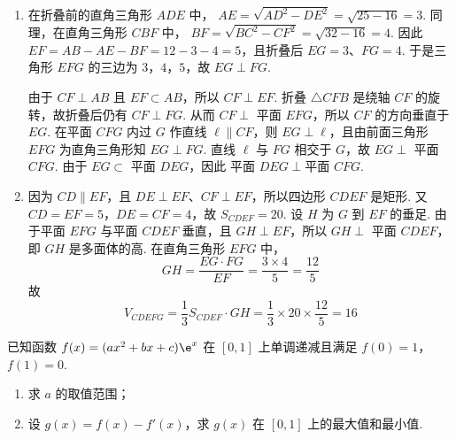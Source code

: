 \begin{solution}
\begin{enumerate}
\item 在折叠前的直角三角形 \(ADE\) 中，
\(AE=\sqrt{AD^2-DE^2}=\sqrt{25-16}=3\). 同理，在直角三角形 \(CBF\) 中，
\(BF=\sqrt{BC^2-CF^2}=\sqrt{32-16}=4\). 因此
\(EF=AB-AE-BF=12-3-4=5\)，且折叠后
\(EG=3\)、\(FG=4\). 于是三角形 \(EFG\) 的三边为 \(3\)，\(4\)，\(5\)，故
\(EG\perp FG\).

由于 \(CF\perp AB\) 且 \(EF\subset AB\)，所以 \(CF\perp EF\). 折叠 \(\triangle CFB\) 是绕轴 \(CF\) 的旋转，故折叠后仍有 \(CF\perp FG\). 从而
\(CF\perp\) 平面 \(EFG\)，所以 \(CF\) 的方向垂直于 \(EG\). 在平面 \(CFG\) 内过 \(G\) 作直线 \(\ell\parallel CF\)，则 \(EG\perp\ell\)，且由前面三角形 \(EFG\) 为直角三角形知 \(EG\perp FG\). 直线 \(\ell\) 与 \(FG\) 相交于 \(G\)，故
\(EG\perp\) 平面 \(CFG\). 由于 \(EG\subset\) 平面 \(DEG\)，因此
\(\text{平面 }DEG\perp\text{平面 }CFG\).

\item 因为 \(CD\parallel EF\)，且 \(DE\perp EF\)、\(CF\perp EF\)，所以四边形 \(CDEF\) 是矩形. 又 \(CD=EF=5\)，\(DE=CF=4\)，故
\(S_{CDEF}=20\). 设 \(H\) 为 \(G\) 到 \(EF\) 的垂足. 由于平面 \(EFG\) 与平面 \(CDEF\) 垂直，且 \(GH\perp EF\)，所以 \(GH\perp\) 平面 \(CDEF\)，即 \(GH\) 是多面体的高. 在直角三角形 \(EFG\) 中，
\[
GH=\frac{EG\cdot FG}{EF}=\frac{3\times4}{5}=\frac{12}{5}
\]
故
\[
V_{CDEFG}=\frac13S_{CDEF}\cdot GH
 =\frac13\times20\times\frac{12}{5}=16
\]
\end{enumerate}
\end{solution}

\begin{problem}
已知函数 \( f(x) = (ax^2 + bx + c)\e^x \) 在 \([0,1]\) 上单调递减且满足 \( f(0) = 1 \)，\( f(1) = 0 \).
\begin{enumerate}
\item 求 \(a\) 的取值范围；
\item 设 \( g(x) = f(x) - f'(x) \)，求 \(g(x)\) 在 \([0,1]\) 上的最大值和最小值.
\end{enumerate}
\end{problem}

